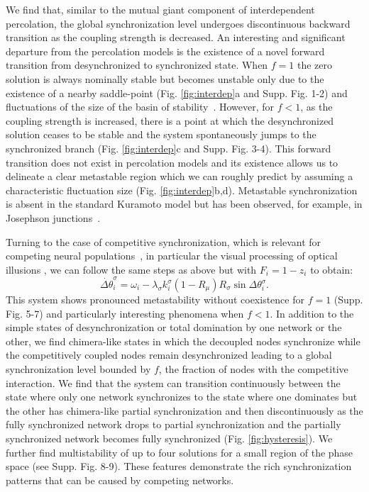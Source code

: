\documentclass[pre,twocolumn,superscriptaddress]{revtex4}
\newcommand{\1}{\mathds{1}}
\begin{document}
{We find that, similar to the mutual giant component of interdependent percolation, the global synchronization level undergoes discontinuous  backward transition as the coupling strength is decreased.
An interesting and significant departure from the percolation models is the existence of a novel forward transition from desynchronized to synchronized state.
When $f=1$ the zero solution is always nominally stable but becomes unstable only due to the existence of a nearby saddle-point (Fig. \ref{fig:interdep}a and Supp. Fig. 1-2) and fluctuations of the size of the basin of stability~\cite{zou-prl2014}.
However, for $f<1$, as the coupling strength is increased, there is a point at which the desynchronized solution ceases to be stable and the system spontaneously jumps to the synchronized branch (Fig. \ref{fig:interdep}c and Supp. Fig. 3-4).  
This forward transition does not exist in percolation models and its existence allows us to delineate a clear metastable region which we can roughly predict by assuming a characteristic fluctuation size (Fig. \ref{fig:interdep}b,d).
Metastable synchronization is absent in the standard Kuramoto model but has been observed, for example, in Josephson junctions~\cite{barbara-prl1999,filatrella-pre2007}.


Turning to the case of competitive synchronization, which is relevant for competing neural populations~\cite{fox-pnas2005}, in particular the visual processing of optical illusions \cite{eagleman-naturereviews2001},
we can follow the same steps as above but with $F_i = 1 - z_i$ to obtain:
\begin{equation}\label{eq:compKura2}
\dot{\Delta\theta}_i^\sigma=\omega_i-\lambda_\sigma k_i^{\sigma}(1 - R_{\mu})R_{\sigma}\sin\Delta\theta_i^\sigma.
\end{equation}
This system shows pronounced metastability without coexistence for $f=1$ (Supp. Fig. 5-7) and particularly interesting phenomena when $f<1$.
In addition to the simple states of desynchronization or total domination by one network or the other, we find chimera-like states in which the decoupled nodes synchronize while the competitively coupled nodes remain desynchronized leading to a global synchronization level bounded by $f$, the fraction of nodes with the competitive interaction.  
We find that the system can transition continuously between the state where only one network synchronizes to the state where one dominates but the other has chimera-like partial synchronization and then discontinuously as the fully synchronized network drops to partial synchronization and the partially synchronized network becomes fully synchronized (Fig. \ref{fig:hysteresis}).  We further find multistability of up to four solutions for a small region of the phase space (see Supp. Fig. 8-9).  These features demonstrate the rich synchronization patterns that can be caused by competing networks.

}
\end{document}
